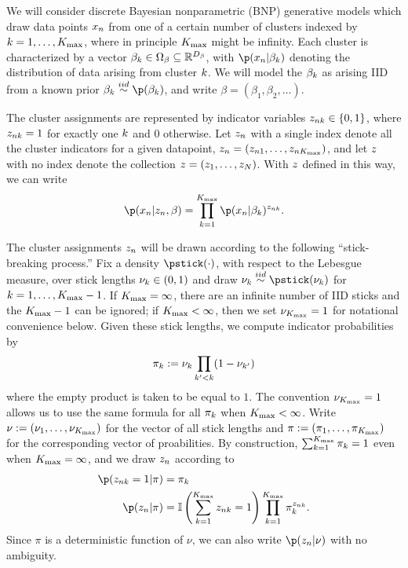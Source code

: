 We will consider discrete Bayesian nonparametric (BNP) generative models which
draw data points $x_n$ from one of a certain number of clusters indexed by $k =
1, \ldots, {K_{\mathrm{max}}}$, where in principle ${K_{\mathrm{max}}}$ might be infinity.  Each cluster
is characterized by a vector $\beta_k \in \Omega_{\beta} \subseteq
\mathbb{R}^{{D_{\beta}}}$, with $\p(\x_n \vert \beta_\k)$ denoting the
distribution of data arising from  cluster $k$. We will model the $\beta_k$
as arising IID from a known prior $\beta_\k \iid \p(\beta_\k)$, and write
$\beta = (\beta_1, \beta_2, \ldots)$.

The cluster assignments are represented by indicator variables $z_{nk} \in
\{0, 1\}$, where $z_{nk} = 1$ for exactly one $k$ and $0$ otherwise.  Let
$z_n$ with a single index denote all the cluster indicators for a given
datapoint, $z_n = (z_{n1}, \ldots, z_{n{K_{\mathrm{max}}}})$, and let $z$ with no
index denote the collection $z = (z_1, \ldots, z_N)$.  With $z$ defined in
this way, we can write
%
\begin{align*}
%
\p(\x_n \vert \z_\n, \beta) =
    \prod_{k=1}^\kmax \p(\x_n \vert \beta_\k)^{\z_{\n\k}}.
%
\end{align*}


The cluster assignments $z_{n}$ will be drawn according to the following
``stick-breaking process.''  Fix a density $\pstick(\cdot)$, with respect to the
Lebesgue measure, over stick lengths $\nu_{k} \in (0, 1)$ and draw $\nuk \iid
\pstick(\nuk)$ for $k=1,\ldots,{K_{\mathrm{max}}} - 1$.  If ${K_{\mathrm{max}}} = \infty$, there are an
infinite number of IID sticks and the ${K_{\mathrm{max}}} - 1$ can be ignored; if ${K_{\mathrm{max}}} <
\infty$, then we set $\nu_{{K_{\mathrm{max}}}} = 1$ for notational convenience below.  Given
these stick lengths, we compute indicator probabilities by
%
\begin{align*}
%
\pi_\k := \nuk \prod_{\k' < \k} (1 - \nu_{\k'})
%
\end{align*}
%
where the empty product is taken to be equal to $1$. The convention $\nu_{{K_{\mathrm{max}}}} =
1$ allows us to use the same formula for all $\pi_k$ when ${K_{\mathrm{max}}} < \infty$.
Write $\nu := (\nu_1, \ldots, \nu_{{K_{\mathrm{max}}}})$ for the vector of all stick lengths
and $\pi := (\pi_1, \ldots, \pi_{K_{\mathrm{max}}})$ for the corresponding vector of
proabilities. By construction, $\sum_{k=1}^{{K_{\mathrm{max}}}} \pi_k = 1$ even when ${K_{\mathrm{max}}} =
\infty$, and we draw $z_n$ according to
%
\begin{align*}
%
\p(\z_{\n\k} = 1 \vert \pi) ={}& \pi_\k \\
\p(\z_\n \vert \pi) ={}&
    \ind{\sum_{\k=1}^{\kmax} \z_{\n\k} = 1}
    \prod_{k=1}^{\kmax} \pi_\k^{\z_{\n\k}}.
%
\end{align*}
%
Since $\pi$ is a deterministic function of $\nu$, we can also write
$\p(\z_\n \vert \nu)$ with no ambiguity.

